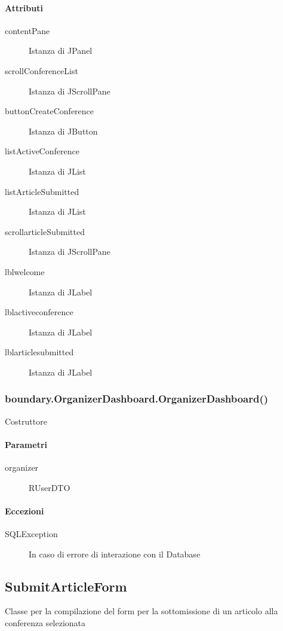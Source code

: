 \paragraph{Attributi}
\begin{description}
\item[contentPane] Istanza di JPanel
\item[scrollConferenceList] Istanza di JScrollPane
\item[buttonCreateConference] Istanza di JButton
\item[listActiveConference] Istanza di JList
\item[listArticleSubmitted] Istanza di JList
\item[scrollarticleSubmitted] Istanza di JScrollPane
\item[lblwelcome] Istanza di JLabel
\item[lblactiveconference] Istanza di JLabel
\item[lblarticlesubmitted] Istanza di JLabel
\end{description}

\subsubsection{boundary.OrganizerDashboard.OrganizerDashboard()}
Costruttore
\paragraph{Parametri}
\begin{description}
\item[organizer] RUserDTO
\end{description}
\paragraph{Eccezioni}
\begin{description}
\item[SQLException] In caso di errore di interazione con il Database
\end{description}
\subsection{SubmitArticleForm}
Classe per la compilazione del form per la sottomissione di un articolo alla conferenza selezionata
